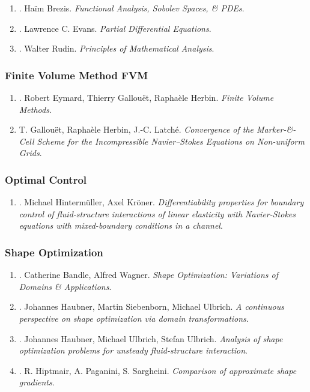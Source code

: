 \documentclass{article}
\begin{document}
\begin{enumerate}
	\item \cite{Brezis2011}. Ha\"im Brezis. {\it Functional Analysis, Sobolev Spaces, \& PDEs}.\hfill{\sf[reading]}
	\item \cite{Evans2010}. Lawrence C. Evans. {\it Partial Differential Equations}.\hfill{\sf[reading]}
	\item \cite{Rudin1976}. Walter Rudin. {\it Principles of Mathematical Analysis}.\hfill{\sf[done]}
\end{enumerate}

\subsubsection{Finite Volume Method FVM}

\begin{enumerate}
	\item \cite{Eymard_Gallouet_Herbin2019}. Robert Eymard, Thierry Gallou\"et, Rapha\`ele Herbin. {\it Finite Volume Methods}.\hfill{\sf[reading]}
	\item T. Gallou\"et, Rapha\`ele Herbin, J.-C. Latch\'e. {\it Convergence of the Marker-\&-Cell Scheme for the Incompressible Navier--Stokes Equations on Non-uniform Grids}.\hfill{\sf[reading]}
\end{enumerate}

\subsubsection{Optimal Control}

\begin{enumerate}
	\item \cite{Hintermueller_Kroener2023}. Michael Hinterm\"uller, Axel Kr\"oner. {\it Differentiability properties for boundary control of fluid-structure interactions of linear elasticity with Navier-Stokes equations with mixed-boundary conditions in a channel}.\hfill{\sf[done]}
\end{enumerate}

\subsubsection{Shape Optimization}

\begin{enumerate}
	\item \cite{Bandle_Wagner2023}. Catherine Bandle, Alfred Wagner. {\it Shape Optimization: Variations of Domains \& Applications}.\hfill{\sf[reading]}
	\item \cite{Haubner_Siebenborn_Ulbrich2021}. Johannes Haubner, Martin Siebenborn, Michael Ulbrich. {\it A continuous perspective on shape optimization via domain transformations}.\hfill{\sf[done]}
	\item \cite{Haubner_Ulbrich_Ulbrich2020}. Johannes Haubner, Michael Ulbrich, Stefan Ulbrich. {\it Analysis of shape optimization problems for unsteady fluid-structure interaction}.\hfill{\sf[done]}
	\item \cite{Hiptmair_Paganini_Sargheini2015}. R. Hiptmair, A. Paganini, S. Sargheini. {\it Comparison of approximate shape gradients}.\hfill{\sf[done]}
\end{enumerate}
\end{document}
